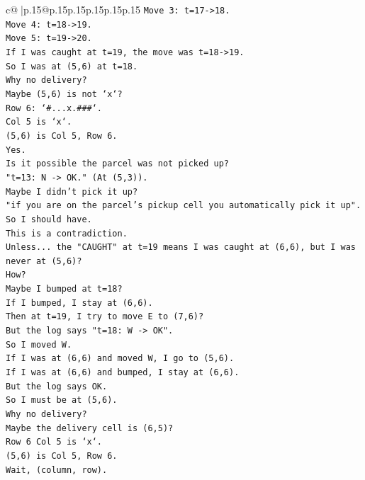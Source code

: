 \documentclass{article}
\begin{document}
{\begin{supertabular}{c@{$\;$}|p{.15\linewidth}@{}p{.15\linewidth}p{.15\linewidth}p{.15\linewidth}p{.15\linewidth}p{.15\linewidth}}
{{{\texttt{Move 3: t=17{-}>18.} \\
\texttt{Move 4: t=18{-}>19.} \\
\texttt{Move 5: t=19{-}>20.} \\
\texttt{If I was caught at t=19, the move was t=18{-}>19.} \\
\texttt{So I was at (5,6) at t=18.} \\
\texttt{Why no delivery?} \\
\texttt{Maybe (5,6) is not `x`?} \\
\texttt{Row 6: `\#...x.\#\#\#`.} \\
\texttt{Col 5 is `x`.} \\
\texttt{(5,6) is Col 5, Row 6.} \\
\texttt{Yes.} \\
\texttt{Is it possible the parcel was not picked up?} \\
\texttt{"t=13: N {-}> OK." (At (5,3)).} \\
\texttt{Maybe I didn't pick it up?} \\
\texttt{"if you are on the parcel's pickup cell you automatically pick it up".} \\
\texttt{So I should have.} \\
\texttt{This is a contradiction.} \\
\texttt{Unless... the "CAUGHT" at t=19 means I was caught at (6,6), but I was never at (5,6)?} \\
\texttt{How?} \\
\texttt{Maybe I bumped at t=18?} \\
\texttt{If I bumped, I stay at (6,6).} \\
\texttt{Then at t=19, I try to move E to (7,6)?} \\
\texttt{But the log says "t=18: W {-}> OK".} \\
\texttt{So I moved W.} \\
\texttt{If I was at (6,6) and moved W, I go to (5,6).} \\
\texttt{If I was at (6,6) and bumped, I stay at (6,6).} \\
\texttt{But the log says OK.} \\
\texttt{So I must be at (5,6).} \\
\texttt{Why no delivery?} \\
\texttt{Maybe the delivery cell is (6,5)?} \\
\texttt{Row 6 Col 5 is `x`.} \\
\texttt{(5,6) is Col 5, Row 6.} \\
\texttt{Wait, (column, row).} \\
}}}
\end{supertabular}}
\end{document}
